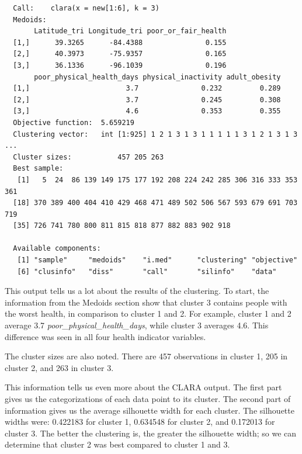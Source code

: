 \documentclass[12pt,twoside]{amherstthesis}
\begin{document}
  \begin{verbatim}
  Call:    clara(x = new[1:6], k = 3) 
  Medoids:
       Latitude_tri Longitude_tri poor_or_fair_health
  [1,]      39.3265      -84.4388               0.155
  [2,]      40.3973      -75.9357               0.165
  [3,]      36.1336      -96.1039               0.196
       poor_physical_health_days physical_inactivity adult_obesity
  [1,]                       3.7               0.232         0.289
  [2,]                       3.7               0.245         0.308
  [3,]                       4.6               0.353         0.355
  Objective function:  5.659219
  Clustering vector:   int [1:925] 1 2 1 3 1 3 1 1 1 1 1 3 1 2 1 3 1 3 ...
  Cluster sizes:           457 205 263 
  Best sample:
   [1]   5  24  86 139 149 175 177 192 208 224 242 285 306 316 333 353 361
  [18] 370 389 400 404 410 429 468 471 489 502 506 567 593 679 691 703 719
  [35] 726 741 780 800 811 815 818 877 882 883 902 918
  
  Available components:
   [1] "sample"     "medoids"    "i.med"      "clustering" "objective" 
   [6] "clusinfo"   "diss"       "call"       "silinfo"    "data"      
  \end{verbatim}
  
  This output tells us a lot about the results of the clustering. To
  start, the information from the Medoids section show that cluster 3
  contains people with the worst health, in comparison to cluster 1 and 2.
  For example, cluster 1 and 2 average 3.7
  \emph{poor\_physical\_health\_days}, while cluster 3 averages 4.6. This
  difference was seen in all four health indicator variables.
  
  The cluster sizes are also noted. There are 457 observations in cluster
  1, 205 in cluster 2, and 263 in cluster 3.
  
  \begin{Shaded}
  \begin{Highlighting}[]
  \OperatorTok{$}
  \OperatorTok{$}
  \end{Highlighting}
  \end{Shaded}
  
  This information tells us even more about the CLARA output. The first
  part gives us the categorizations of each data point to its cluster. The
  second part of information gives us the average silhouette width for
  each cluster. The silhouette widths were: 0.422183 for cluster 1,
  0.634548 for cluster 2, and 0.172013 for cluster 3. The better the
  clustering is, the greater the silhouette width; so we can determine
  that cluster 2 was best compared to cluster 1 and 3.
  
\end{document}
